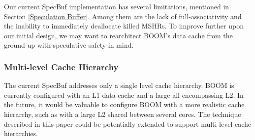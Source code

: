 Our current SpecBuf implementation has several limitations, mentioned in Section \ref{Speculation Buffer}.
Among them are the lack of full-associativity and the inability to immediately deallocate killed MSHRs.
To improve further upon our initial design, we may want to rearchitect BOOM's data cache from
the ground up with speculative safety in mind.

\subsubsection{Multi-level Cache Hierarchy}

The current SpecBuf addresses only a single level cache hierarchy.
BOOM is currently configured with an L1 data cache and a large all-encompassing L2.
In the future, it would be valuable to configure BOOM with a more realistic cache hierarchy,
such as with a large L2 shared between several cores. The technique described in this paper
could be potentially extended to support multi-level cache hierarchies.
